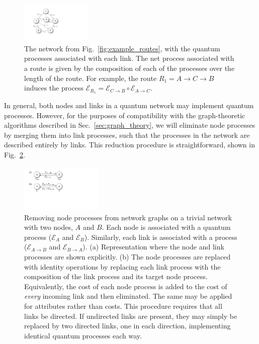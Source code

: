 \begin{figure}[!htb]
\includegraphics[width=0.3\textwidth]{example_graph}
\caption{The network from Fig.~\ref{fig:example_routes}, with the quantum processes associated with each link. The net process associated with a route is given by the composition of each of the processes over the length of the route. For example, the route \mbox{$R_1=A\to C\to B$} induces the process \mbox{$\mathcal{E}_{R_1} = \mathcal{E}_{C\to B} \circ \mathcal{E}_{A\to C}$}.} \label{fig:example_proc_graph}
\end{figure}

In general, both nodes and links in a quantum network may implement quantum processes. However, for the purposes of compatibility with the graph-theoretic algorithms described in Sec.~\ref{sec:graph_theory}, we will eliminate node processes by merging them into link processes, such that the processes in the network are described entirely by links. This reduction procedure is straightforward, shown in Fig.~\ref{fig:remove_nodes}.

\begin{figure}[!htb]
\includegraphics[width=0.35\textwidth]{remove_nodes}
\caption{Removing node processes from network graphs on a trivial network with two nodes, $A$ and $B$. Each node is associated with a quantum process ($\mathcal{E}_A$ and $\mathcal{E}_B$). Similarly, each link is associated with a process ($\mathcal{E}_{A\to B}$ and $\mathcal{E}_{B\to A}$). (a) Representation where the node and link processes are shown explicitly. (b) The node processes are replaced with identity operations by replacing each link process with the composition of the link process and its target node process. Equivalently, the cost of each node process is added to the cost of \textit{every} incoming link and then eliminated. The same may be applied for attributes rather than costs. This procedure requires that all links be directed. If undirected links are present, they may simply be replaced by two directed links, one in each direction, implementing identical quantum processes each way.} \label{fig:remove_nodes}
\end{figure}


